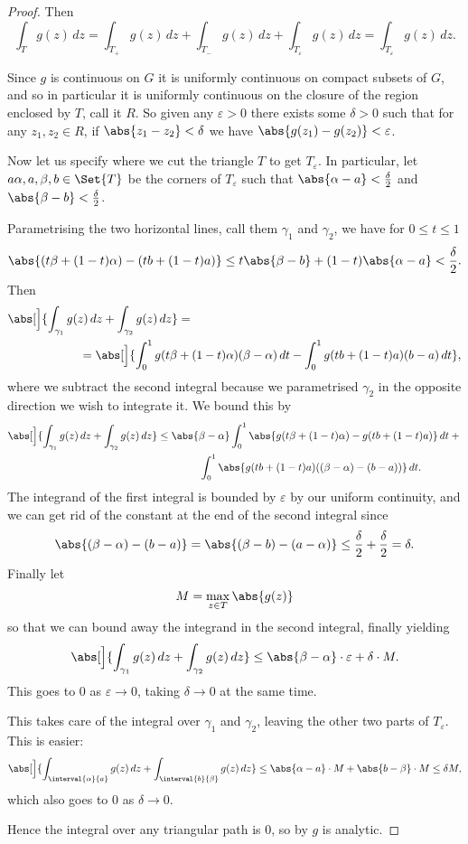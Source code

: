 \begin{proof}
	Then
	\[
		\int_T g(z) \, d z = \int_{T_+} g(z) \, d z + \int_{T_-} g(z) \, d z + \int_{T_\varepsilon} g(z) \, d z = \int_{T_\varepsilon} g(z) \, d z.
	\]

	Since $g$ is continuous on $G$ it is uniformly continuous on compact subsets of $G$, and so in particular it is uniformly continuous on the closure of the region enclosed by $T$, call it $R$.
	So given any $\varepsilon > 0$ there exists some $\delta > 0$ such that for any $z_1, z_2 \in R$, if $\abs{z_1 - z_2} < \delta$ we have $\abs{g(z_1) - g(z_2)} < \varepsilon$.

	Now let us specify where we cut the triangle $T$ to get $T_\varepsilon$.
	In particular, let $a\alpha, a, \beta, b \in \Set{T}$ be the corners of $T_\varepsilon$ such that $\abs{\alpha - a} < \frac{\delta}{2}$ and $\abs{\beta - b} < \frac{\delta}{2}$.

	Parametrising the two horizontal lines, call them $\gamma_1$ and $\gamma_2$, we have for $0 \leq t \leq 1$
	\[
		\abs{(t \beta + (1 - t) \alpha) - (t b + (1 - t) a)} \leq t \abs{\beta - b} + (1 - t) \abs{\alpha - a} < \frac{\delta}{2}.
	\]
	Then
	\begin{align*}
		&\abs[\Big]{\int_{\gamma_1} g(z) \, d z + \int_{\gamma_2} g(z) \, d z} = \\
		&\qquad\qquad\qquad = \abs[\Big]{\int_0^1 g(t \beta + (1 - t) \alpha) (\beta - \alpha) \, d t - \int_0^1 g(t b + (1 - t) a) (b - a) \, d t},
	\end{align*}
	where we subtract the second integral because we parametrised $\gamma_2$ in the opposite direction we wish to integrate it.
	We bound this by
	\begin{align*}
		\abs[\Big]{\int_{\gamma_1} g(z) \, d z + \int_{\gamma_2} g(z) \, d z} &\leq \abs{\beta - \alpha} \int_0^1 \abs{g(t \beta + (1 -t)\alpha) - g(t b + (1 - t) a)} \, d t + {} \\
		& \qquad\qquad\int_0^1 \abs{g(t b + (1 - t) a) ((\beta - \alpha) - (b - a))} \, d t.
	\end{align*}
	The integrand of the first integral is bounded by $\varepsilon$ by our uniform continuity, and we can get rid of the constant at the end of the second integral since
	\[
		\abs{(\beta - \alpha) - (b - a)} = \abs{(\beta - b) - (a - \alpha)} \leq \frac{\delta}{2} + \frac{\delta}{2} = \delta.
	\]
	Finally let
	\[
		M = \max_{z \in T} \abs{g(z)}
	\]
	so that we can bound away the integrand in the second integral, finally yielding
	\[
		\abs[\Big]{\int_{\gamma_1} g(z) \, d z + \int_{\gamma_2} g(z) \, d z} \leq \abs{\beta - \alpha} \cdot \varepsilon + \delta \cdot M.
	\]
	This goes to $0$ as $\varepsilon \to 0$, taking $\delta \to 0$ at the same time.

	This takes care of the integral over $\gamma_1$ and $\gamma_2$, leaving the other two parts of $T_\varepsilon$.
	This is easier:
	\[
		\abs[\Big]{\int_{\interval{\alpha}{a}} g(z) \, d z + \int_{\interval{b}{\beta}} g(z) \, d z} \leq \abs{\alpha - a} \cdot M + \abs{b - \beta} \cdot M \leq \delta M,
	\]
	which also goes to $0$ as $\delta \to 0$.

	Hence the integral over any triangular path is $0$, so by  $g$ is analytic.
\end{proof}


